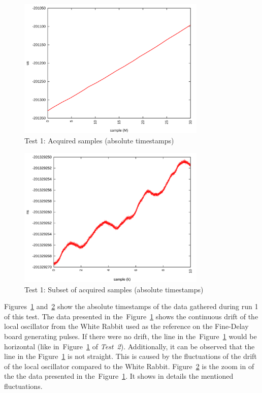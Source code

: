 \documentclass[a4paper, 12pt]{article}
\begin{document}
\begin{figure}[ht!]
  \centering
   \includegraphics[width=0.80\textwidth]{img/test1_samples_absolute.png}
  \caption{Test 1: Acquired samples (absolute timestamps)}
  \label{test1_absolute}
\end{figure}

\begin{figure}[ht!]
  \centering
   \includegraphics[width=0.80\textwidth]{img/test1_samples_absolute_zoom.png}
  \caption{Test 1: Subset of acquired samples (absolute timestamps)}
  \label{test1_absolute_zoom}
\end{figure}

Figures~\ref{test1_absolute} and~\ref{test1_absolute_zoom} show the absolute
timestamps of the data gathered during run 1 of this test.
The data presented in the~Figure~\ref{test1_absolute} shows the continuous
drift of the local oscillator from the White Rabbit used as the reference on
the Fine-Delay board generating pulses.
If there were no drift, the line in the~Figure~\ref{test1_absolute} would be
horizontal (like in~Figure~\ref{test1_absolute} of \textit{Test~2}).
Additionally, it can be observed that the line in the
Figure~\ref{test1_absolute} is not straight.
This is caused by the fluctuations of the drift of the local oscillator
compared to the White Rabbit.
Figure~\ref{test1_absolute_zoom} is the zoom in of the the data presented in
the~Figure~\ref{test1_absolute}. It shows in details the mentioned fluctuations.
\end{document}
